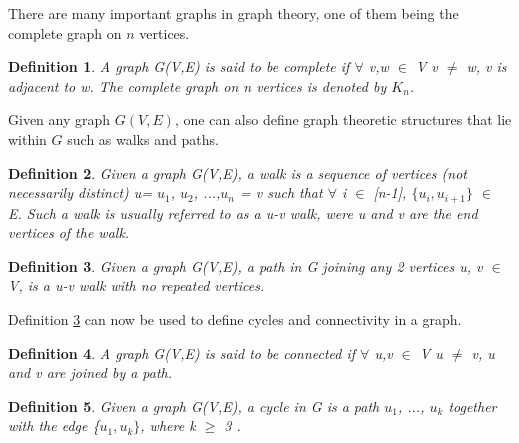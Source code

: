 \documentclass[12pt]{article}
\newtheorem{definition}{Definition}[subsection]
\numberwithin{equation}{subsection}
\numberwithin{table}{subsection}
\numberwithin{algorithm}{subsection}
\numberwithin{figure}{subsection}
\begin{document}
There are many important graphs in graph theory, one of them being the complete graph on $\mathit{n}$ vertices.
\begin{definition}
\label{Complete Graph}
A graph G(V,E) is said to be complete if $\forall$ v,w $\in$ V v $\neq$ w, v is adjacent to w. The complete graph on n vertices is denoted by $K_n$. 
\end{definition}
Given any graph $\mathit{G(V,E)}$, one can also define graph theoretic structures that lie within $\mathit{G}$ such as walks and paths.
\begin{definition}
\label{walk}
Given a graph G(V,E), a walk is a sequence of vertices (not necessarily distinct) u= $u_1$, $u_2$, ...,$u_n$ = v such that $\forall$ i $\in$ [n-1], $\{u_i, u_{i+1}\}$ $\in$ E. Such a walk is usually referred to as a u-v walk, were u and v are the end vertices of the walk. 
\end{definition}
\begin{definition}
\label{Path}
Given a graph G(V,E), a path in G joining any 2 vertices u, v $\in$ V, is a u-v walk with no repeated vertices.
\end{definition}
Definition \ref{Path} can now be used to define cycles and connectivity in a graph.
\begin{definition}
\label{connectedgraph}
A graph G(V,E) is said to be connected if $\forall$ u,v $\in$ V u $\neq$ v, u and v are joined by a path. 
\end{definition}
\begin{definition}
\label{cycle}
Given a graph G(V,E), a cycle in G is a path $u_1$, ..., $u_k$ together with the edge \{$u_1, u_k\}$, where k $\geq$ 3 . 
\end{definition}
\end{document}

